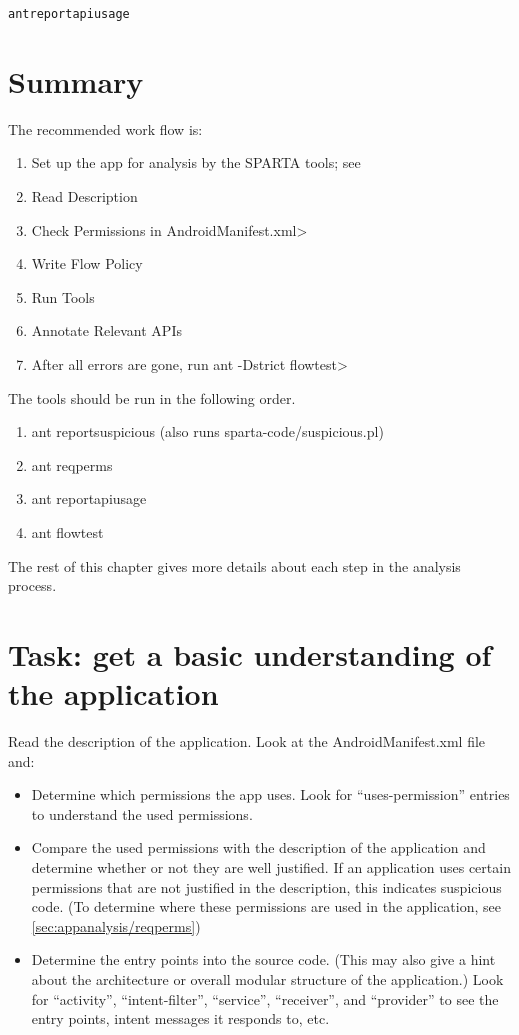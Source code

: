\begin{alltt}
ant reportapiusage
\end{alltt}


\section{Summary}

The recommended work flow is:  

\begin{enumerate}
\item Set up the app for analysis by the SPARTA tools; see 
\item Read Description
\item Check Permissions in \<AndroidManifest.xml>
\item Write Flow Policy
\item Run Tools
\item Annotate Relevant APIs
\item After all errors are gone, run \<ant -Dstrict flowtest>
\end{enumerate}

\noindent 
The tools should be run in the following order. 

\begin{enumerate}
\item ant reportsuspicious (also runs sparta-code/suspicious.pl)
\item ant reqperms
\item ant reportapiusage
\item ant flowtest
\end{enumerate}

\noindent 
The rest of this chapter gives more details about each step in the analysis process.




\section{Task: get a basic understanding of the application}
Read the description of the application.  
Look at the AndroidManifest.xml file and:
\begin{itemize}
\item Determine which permissions the app uses.
  Look for ``uses-permission'' entries to understand the used
  permissions.
\item Compare the used permissions with the description of the
  application and determine whether or not they are well justified.
  If an application uses certain permissions that are not justified
  in the description, this indicates suspicious code. 
  (To determine where these permissions are used in the application,
   see \ref{sec:appanalysis/reqperms})
\item Determine the entry points into the source code. (This may also give
  a hint about the architecture or overall modular structure of the
  application.)
  Look for ``activity'', ``intent-filter'', ``service'', ``receiver'', and
  ``provider'' to see the entry points, intent messages it responds to,
  etc.
\end{itemize}

